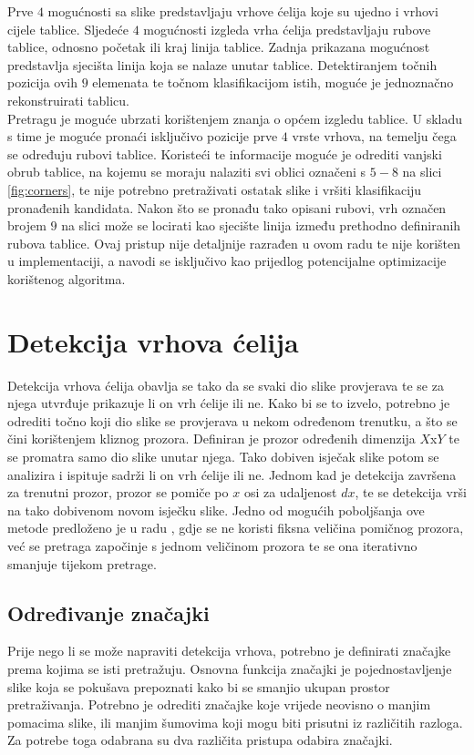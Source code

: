 \documentclass[times, utf8, zavrsni, numeric]{fer}
\begin{document}
Prve $4$ mogućnosti sa slike predstavljaju vrhove ćelija koje su ujedno i vrhovi cijele tablice. 
Sljedeće $4$ mogućnosti izgleda vrha ćelija predstavljaju rubove tablice, odnosno početak ili kraj linija tablice.
Zadnja prikazana mogućnost predstavlja sjecišta linija koja se nalaze unutar tablice.
Detektiranjem točnih pozicija ovih $9$ elemenata te točnom klasifikacijom istih, moguće je jednoznačno rekonstruirati tablicu.\\

Pretragu je moguće ubrzati korištenjem znanja o općem izgledu tablice.
U skladu s time je moguće pronaći isključivo pozicije prve $4$ vrste vrhova, na temelju čega se određuju rubovi tablice.
Koristeći te informacije moguće je odrediti vanjski obrub tablice, na kojemu se moraju nalaziti svi oblici označeni s $5-8$ na slici \ref{fig:corners}, te nije potrebno pretraživati ostatak slike i vršiti klasifikaciju pronađenih kandidata.
Nakon što se pronađu tako opisani rubovi, vrh označen brojem $9$ na slici može se locirati kao sjecište linija između prethodno definiranih rubova tablice.
Ovaj pristup nije detaljnije razrađen u ovom radu te nije korišten u implementaciji, a navodi se isključivo kao prijedlog potencijalne optimizacije korištenog algoritma.

\section{Detekcija vrhova ćelija}
Detekcija vrhova ćelija obavlja se tako da se svaki dio slike provjerava te se za njega utvrđuje prikazuje li on vrh ćelije ili ne. 
Kako bi se to izvelo, potrebno je odrediti točno koji dio slike se provjerava u nekom određenom trenutku, a što se čini korištenjem kliznog prozora. 
Definiran je prozor određenih dimenzija $X$x$Y$ te se promatra samo dio slike unutar njega. 
Tako dobiven isječak slike potom se analizira i ispituje sadrži li on vrh ćelije ili ne.
Jednom kad je detekcija završena za trenutni prozor, prozor se pomiče po $x$ osi za udaljenost $dx$, te se detekcija vrši na tako dobivenom novom isječku slike.
Jedno od mogućih poboljšanja ove metode predloženo je u radu \cite{ViolaJones}, gdje se ne koristi fiksna veličina pomičnog prozora, već se pretraga započinje s jednom veličinom prozora te se ona iterativno smanjuje tijekom pretrage.


\subsection{Određivanje značajki}
Prije nego li se može napraviti detekcija vrhova, potrebno je definirati značajke prema kojima se isti pretražuju.
Osnovna funkcija značajki je pojednostavljenje slike koja se pokušava prepoznati kako bi se smanjio ukupan prostor pretraživanja.
Potrebno je odrediti značajke koje vrijede neovisno o manjim pomacima slike, ili manjim šumovima koji mogu biti prisutni iz različitih razloga.
Za potrebe toga odabrana su dva različita pristupa odabira značajki.\\
\end{document}
